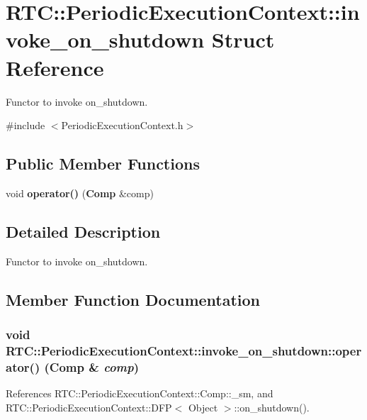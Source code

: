 \section{RTC::PeriodicExecutionContext::invoke\_\-on\_\-shutdown Struct Reference}
\label{structRTC_1_1PeriodicExecutionContext_1_1invoke__on__shutdown}


Functor to invoke on\_\-shutdown.  




{\ttfamily \#include $<$PeriodicExecutionContext.h$>$}

\subsection*{Public Member Functions}
\begin{DoxyCompactItemize}
\item 
void {\bf operator()} ({\bf Comp} \&comp)
\end{DoxyCompactItemize}


\subsection{Detailed Description}
Functor to invoke on\_\-shutdown. 

\subsection{Member Function Documentation}
\subsubsection[{operator()}]{\setlength{\rightskip}{0pt plus 5cm}void RTC::PeriodicExecutionContext::invoke\_\-on\_\-shutdown::operator() ({\bf Comp} \& {\em comp})\hspace{0.3cm}{\ttfamily  [inline]}}\label{structRTC_1_1PeriodicExecutionContext_1_1invoke__on__shutdown_a4da104c45a5f714bcfe37ec50055305a}


References RTC::PeriodicExecutionContext::Comp::\_\-sm, and RTC::PeriodicExecutionContext::DFP$<$ Object $>$::on\_\-shutdown().

